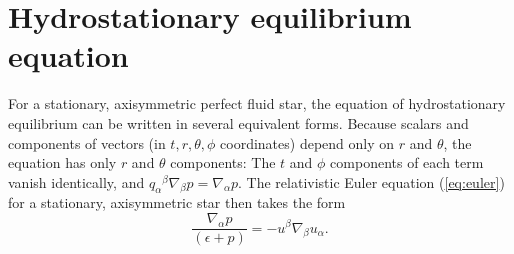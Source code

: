 \documentclass[12pt]{article}
\def\a{\alpha}
\def\b{\beta}
\def\a{\alpha}
\def\b{\beta}
\begin{document}


\section{Hydrostationary equilibrium equation}

For a stationary, axisymmetric perfect fluid star, the equation 
of hydrostationary equilibrium can be written in several
equivalent forms.  Because scalars and components of vectors 
(in $t,r, \theta,\phi$ coordinates) depend only on $r$ and $\theta$, 
the equation has only $r$ and $\theta$ components: 
The $t$ and $\phi$ components of each term vanish 
identically, and $q_\a{}^\b \nabla_\b p = \nabla_\a p$.
The relativistic Euler equation (\ref{eq:euler}) for a stationary, 
axisymmetric star then takes the form
\begin{equation}
\frac{\nabla_\a p}{(\epsilon+p)}= -u^\beta \nabla_\beta u_\a. 
\label{eq:euler2}
\end{equation}
\end{document}
